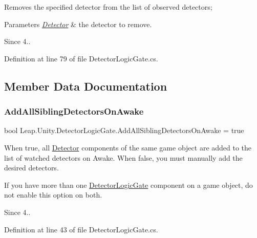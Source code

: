 Removes the specified detector from the list of observed detectors;


\begin{DoxyParams}{Parameters}
{\em \mbox{\hyperlink{class_leap_1_1_unity_1_1_detector}{Detector}}} & the detector to remove. \\
\hline
\end{DoxyParams}
\begin{DoxySince}{Since}
4.. 
\end{DoxySince}


Definition at line 79 of file Detector\+Logic\+Gate.\+cs.



\subsection{Member Data Documentation}
\mbox{\label{class_leap_1_1_unity_1_1_detector_logic_gate_aded5589c25fc872d3f1690da8351e3f1}} 
\subsubsection{\texorpdfstring{AddAllSiblingDetectorsOnAwake}{AddAllSiblingDetectorsOnAwake}}
{\footnotesize\ttfamily bool Leap.\+Unity.\+Detector\+Logic\+Gate.\+Add\+All\+Sibling\+Detectors\+On\+Awake = true}

When true, all \mbox{\hyperlink{class_leap_1_1_unity_1_1_detector}{Detector}} components of the same game object are added to the list of watched detectors on Awake. When false, you must manually add the desired detectors.

If you have more than one \mbox{\hyperlink{class_leap_1_1_unity_1_1_detector_logic_gate}{Detector\+Logic\+Gate}} component on a game object, do not enable this option on both. \begin{DoxySince}{Since}
4.. 
\end{DoxySince}


Definition at line 43 of file Detector\+Logic\+Gate.\+cs.

\mbox{\label{class_leap_1_1_unity_1_1_detector_logic_gate_a972e022cb5a0bdb6d3a6a3358d9190b2}} 
